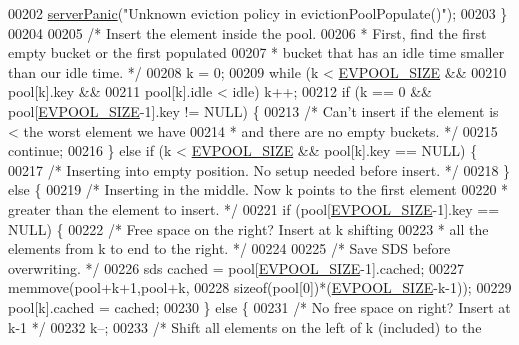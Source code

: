 \begin{DoxyCode}
00202             \hyperlink{server_8h_a11cc378e7778a830b41240578de3b204}{serverPanic}(\textcolor{stringliteral}{"Unknown eviction policy in evictionPoolPopulate()"});
00203         \}
00204 
00205         \textcolor{comment}{/* Insert the element inside the pool.}
00206 \textcolor{comment}{         * First, find the first empty bucket or the first populated}
00207 \textcolor{comment}{         * bucket that has an idle time smaller than our idle time. */}
00208         k = 0;
00209         \textcolor{keywordflow}{while} (k < \hyperlink{evict_8c_a459751f47982906b9beb736ea3519e97}{EVPOOL\_SIZE} &&
00210                pool[k].key &&
00211                pool[k].idle < idle) k++;
00212         \textcolor{keywordflow}{if} (k == 0 && pool[\hyperlink{evict_8c_a459751f47982906b9beb736ea3519e97}{EVPOOL\_SIZE}-1].key != NULL) \{
00213             \textcolor{comment}{/* Can't insert if the element is < the worst element we have}
00214 \textcolor{comment}{             * and there are no empty buckets. */}
00215             \textcolor{keywordflow}{continue};
00216         \} \textcolor{keywordflow}{else} \textcolor{keywordflow}{if} (k < \hyperlink{evict_8c_a459751f47982906b9beb736ea3519e97}{EVPOOL\_SIZE} && pool[k].key == NULL) \{
00217             \textcolor{comment}{/* Inserting into empty position. No setup needed before insert. */}
00218         \} \textcolor{keywordflow}{else} \{
00219             \textcolor{comment}{/* Inserting in the middle. Now k points to the first element}
00220 \textcolor{comment}{             * greater than the element to insert.  */}
00221             \textcolor{keywordflow}{if} (pool[\hyperlink{evict_8c_a459751f47982906b9beb736ea3519e97}{EVPOOL\_SIZE}-1].key == NULL) \{
00222                 \textcolor{comment}{/* Free space on the right? Insert at k shifting}
00223 \textcolor{comment}{                 * all the elements from k to end to the right. */}
00224 
00225                 \textcolor{comment}{/* Save SDS before overwriting. */}
00226                 sds cached = pool[\hyperlink{evict_8c_a459751f47982906b9beb736ea3519e97}{EVPOOL\_SIZE}-1].cached;
00227                 memmove(pool+k+1,pool+k,
00228                     \textcolor{keyword}{sizeof}(pool[0])*(\hyperlink{evict_8c_a459751f47982906b9beb736ea3519e97}{EVPOOL\_SIZE}-k-1));
00229                 pool[k].cached = cached;
00230             \} \textcolor{keywordflow}{else} \{
00231                 \textcolor{comment}{/* No free space on right? Insert at k-1 */}
00232                 k--;
00233                 \textcolor{comment}{/* Shift all elements on the left of k (included) to the}

\end{DoxyCode}

